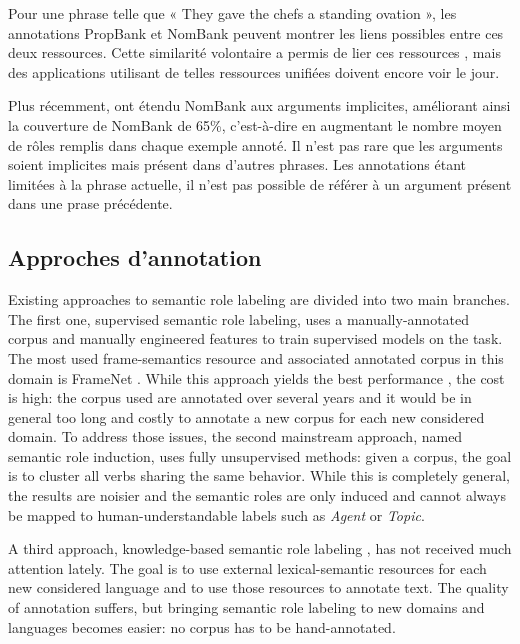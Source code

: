 Pour une phrase telle que « They gave the chefs a standing ovation », les
annotations PropBank et NomBank peuvent montrer les liens possibles entre ces
deux ressources. Cette similarité volontaire a permis de lier ces ressources
\citep{pustejovsky2005merging,verhagen2007combining}, mais des applications
utilisant de telles ressources unifiées doivent encore voir le jour.

Plus récemment, \cite{gerber2010beyond} ont étendu NomBank aux arguments
implicites, améliorant ainsi la couverture de NomBank de 65\%, c'est-à-dire en
augmentant le nombre moyen de rôles remplis dans chaque exemple annoté. Il
n'est pas rare que les arguments soient implicites mais présent dans d'autres
phrases. Les annotations étant limitées à la phrase actuelle, il n'est pas
possible de référer à un argument présent dans une prase précédente.

\subsection{Approches d'annotation}

Existing approaches to semantic role labeling are divided into two main
branches. The first one, supervised semantic role labeling, uses a
manually-annotated corpus and manually engineered features to train supervised
models on the task. The most used frame-semantics resource and associated
annotated corpus in this domain is FrameNet \citep{baker1998berkeley}.
While this approach yields the best performance \citep{das2014frame}, the
cost is high: the corpus used are annotated over several years and it would be
in general too long and costly to annotate a new corpus for each new considered
domain. To address those issues, the second mainstream approach, named semantic
role induction, uses fully unsupervised methods: given a corpus, the goal is to
cluster all verbs sharing the same behavior. While this is completely general,
the results are noisier and the semantic roles are only induced and cannot
always be mapped to human-understandable labels such as \textit{Agent} or
\textit{Topic}.

A third approach, knowledge-based semantic role labeling
\citep{swier2004unsupervised,swier2005exploiting}, has not received much
attention lately. The goal is to use external lexical-semantic resources for
each new considered language and to use those resources to annotate text. The
quality of annotation suffers, but bringing semantic role labeling to new
domains and languages becomes easier: no corpus has to be hand-annotated.

